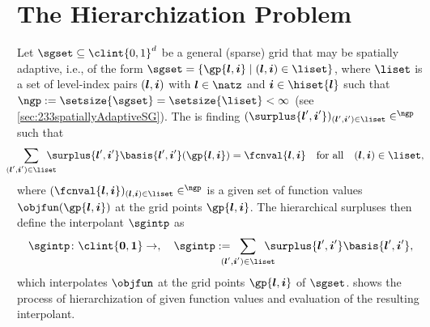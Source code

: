 \section{The Hierarchization Problem}
\label{sec:41problem}

Let $\sgset \subset \clint{0, 1}^d$ be a general (sparse) grid that
may be spatially adaptive, i.e.,
of the form $\sgset = \{\gp{\*l,\*i} \mid (\*l, \*i) \in \liset\}$,
where $\liset$ is a set of level-index pairs $({\boldsymbol{l}}, {\boldsymbol{i}})$ with $\*l \in \natz$
and $\*i \in \hiset{\*l}$ such that
$\ngp := \setsize{\sgset} = \setsize{\liset} < \infty$
(see \cref{sec:233spatiallyAdaptiveSG}).
The  is finding
$(\surplus{\*l',\*i'})_{(\*l',\*i') \in \liset} \in \real^{\ngp}$ such that
\begin{equation}
  \label{eq:hierarchizationProblem}
  \largesum{(\*l', \*i') \in \liset} \surplus{\*l',\*i'}
  \basis{\*l',\*i'}(\gp{\*l,\*i}) = \fcnval{\*l,\*i}
  \quad\text{for all}\quad
  (\*l, \*i) \in \liset,
\end{equation}
where $(\fcnval{\*l,\*i})_{(\*l,\*i) \in \liset} \in \real^{\ngp}$ is a given set of
function values $\objfun(\gp{\*l,\*i})$ at the grid points $\gp{\*l,\*i}$.
The hierarchical surpluses then define the interpolant $\sgintp$ as
\begin{equation}
  \label{eq:hierarchizationInterpolant}
  \sgintp\colon \clint{\*0, \*1} \to \real,\quad
  \sgintp :=
  \largesum{(\*l', \*i') \in \liset} \surplus{\*l',\*i'}
  \basis{\*l',\*i'},
\end{equation}
which interpolates $\objfun$ at the grid points $\gp{\*l,\*i}$ of $\sgset$.
 shows the process of hierarchization of given
function values and evaluation of the resulting interpolant.

